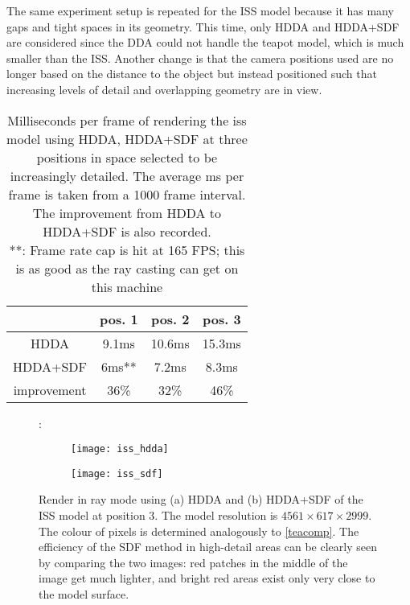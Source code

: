 The same experiment setup is repeated for the ISS model because it has many gaps and tight spaces in its geometry. This time, only HDDA and HDDA+SDF are considered since the DDA could not handle the teapot model, which is much smaller than the ISS. Another change is that the camera positions used are no longer based on the distance to the object but instead positioned such that increasing levels of detail and overlapping geometry are in view.

\begin{table}[h]
  \centering
  \begin{tabular}{|c||c|c|c|}
    \hline
    & pos. 1 & pos. 2 & pos. 3 \\
    \hline
    HDDA & 9.1ms & 10.6ms & 15.3ms \\
    \hline
    HDDA+SDF & 6ms** & 7.2ms & 8.3ms\\
    \hline
    improvement & 36\% & 32\% & 46\%\\
    \hline
  \end{tabular}
  \caption[HDDA vs. HDDA+SDF on ISS model]{Milliseconds per frame of rendering the \acrshort{iss} model using HDDA, HDDA+SDF at three positions in space selected to be increasingly detailed. The average ms per frame is taken from a 1000 frame interval. The improvement from HDDA to HDDA+SDF is also recorded. \\
    **: Frame rate cap is hit at 165 FPS; this is as good as the ray casting can get on this machine}
\end{table}

\begin{figure}[H]
  \centering:
  \begin{subfigure}[b]{0.45\textwidth}
    \texttt{[image: iss\_hdda]}
    \caption{}
  \end{subfigure}
  \hfill
  \begin{subfigure}[b]{0.45\textwidth}
    \texttt{[image: iss\_sdf]}
    \caption{}
  \end{subfigure}
  \caption[ISS HDDA vs. HDDA+SDF comparison]{Render in ray mode using (a) HDDA and (b) HDDA+SDF of the ISS model at position 3. The model resolution is $4561\times617\times2999$. The colour of pixels is determined analogously to \cref{teacomp}. The efficiency of the SDF method in high-detail areas can be clearly seen by comparing the two images: red patches in the middle of the image get much lighter, and bright red areas exist only very close to the model surface.}
\end{figure}

